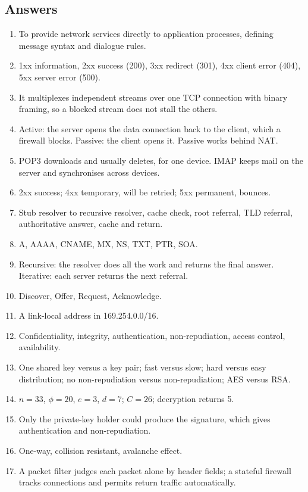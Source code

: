 \documentclass[11pt,a4paper]{article}
\begin{document}
\subsection*{Answers}
\begin{enumerate}
\item To provide network services directly to application processes, defining message syntax and dialogue rules.
\item 1xx information, 2xx success (200), 3xx redirect (301), 4xx client error (404), 5xx server error (500).
\item It multiplexes independent streams over one TCP connection with binary framing, so a blocked stream does not stall the others.
\item Active: the server opens the data connection back to the client, which a firewall blocks. Passive: the client opens it. Passive works behind NAT.
\item POP3 downloads and usually deletes, for one device. IMAP keeps mail on the server and synchronises across devices.
\item 2xx success; 4xx temporary, will be retried; 5xx permanent, bounces.
\item Stub resolver to recursive resolver, cache check, root referral, TLD referral, authoritative answer, cache and return.
\item A, AAAA, CNAME, MX, NS, TXT, PTR, SOA.
\item Recursive: the resolver does all the work and returns the final answer. Iterative: each server returns the next referral.
\item Discover, Offer, Request, Acknowledge.
\item A link-local address in 169.254.0.0/16.
\item Confidentiality, integrity, authentication, non-repudiation, access control, availability.
\item One shared key versus a key pair; fast versus slow; hard versus easy distribution; no non-repudiation versus non-repudiation; AES versus RSA.
\item $n = 33$, $\phi = 20$, $e = 3$, $d = 7$; $C = 26$; decryption returns 5.
\item Only the private-key holder could produce the signature, which gives authentication and non-repudiation.
\item One-way, collision resistant, avalanche effect.
\item A packet filter judges each packet alone by header fields; a stateful firewall tracks connections and permits return traffic automatically.

\end{enumerate}
\end{document}
